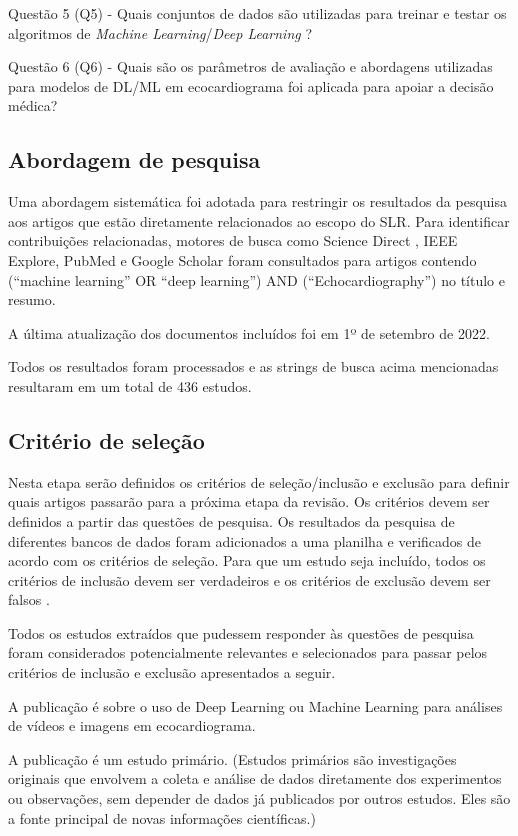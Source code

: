 Questão 5 (Q5) - Quais conjuntos de dados são utilizadas para treinar e testar os algoritmos de \textit{Machine Learning}/\textit{Deep Learning} ?

Questão 6 (Q6) - Quais são os parâmetros de avaliação e abordagens utilizadas para modelos de DL/ML  em ecocardiograma foi aplicada para apoiar a decisão médica?

\subsection {Abordagem de pesquisa}
\label{Abordagem de pesquisa}

Uma abordagem sistemática foi adotada para restringir os resultados da pesquisa aos artigos que estão diretamente relacionados ao escopo do SLR. Para identificar contribuições relacionadas, motores de busca como Science Direct , IEEE Explore, PubMed  e Google Scholar foram consultados para artigos contendo (“machine learning” OR “deep learning”) AND (“Echocardiography”)  no título e resumo. 

A última atualização dos documentos incluídos foi em 1º de setembro de 2022.

Todos os resultados foram processados e as strings de busca acima mencionadas resultaram em um total de 436 estudos.

\subsection {Critério de seleção}
\label{Critério de seleção}

Nesta etapa serão definidos os critérios de seleção/inclusão e exclusão para definir quais artigos passarão para a próxima etapa da revisão. Os critérios devem ser definidos a partir das questões de pesquisa. Os resultados da pesquisa de diferentes bancos de dados foram adicionados a uma planilha e verificados de acordo com os critérios de seleção. Para que um estudo seja incluído, todos os critérios de inclusão devem ser verdadeiros e os critérios de exclusão devem ser falsos \cite{kitchenham2009systematic}.

Todos os estudos extraídos que pudessem responder às questões de pesquisa foram considerados potencialmente relevantes e selecionados para passar pelos critérios de inclusão e exclusão apresentados a seguir.

A publicação é sobre o uso de Deep Learning ou Machine Learning para análises de vídeos e imagens em ecocardiograma. 

A publicação é um estudo primário. (Estudos primários são investigações originais que envolvem a coleta e análise de dados diretamente dos experimentos ou observações, sem depender de dados já publicados por outros estudos. Eles são a fonte principal de novas informações científicas.)

